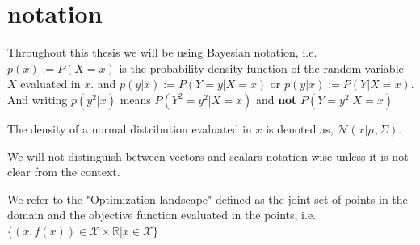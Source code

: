 




\section{notation}
Throughout this thesis we will be using Bayesian notation, i.e. $p(x) := P(X=x)$ is the probability
density function of the random variable $X$ evaluated in $x$. and $p(y|x) := P(Y=y|X=x)$ or $p(y|x)
:= P(Y|X=x)$. And writing $p(y^2|x)$ means $P(Y^2=y^2|X=x)$ and \textbf{not} $P(Y=y^2|X=x)$

The density of a normal distribution evaluated in $x$ is denoted as, $\mathcal{N}(x|\mu, \Sigma)$. 

We will not distinguish between vectors and scalars notation-wise unless it is not clear from the 
context. 

We refer to the "Optimization landscape" defined as the joint set of points in the domain and the objective function
evaluated in the points, i.e. $\{(x,f(x))\in \mathcal{X} \times \mathbb{R}| x \in \mathcal{X}\}$

